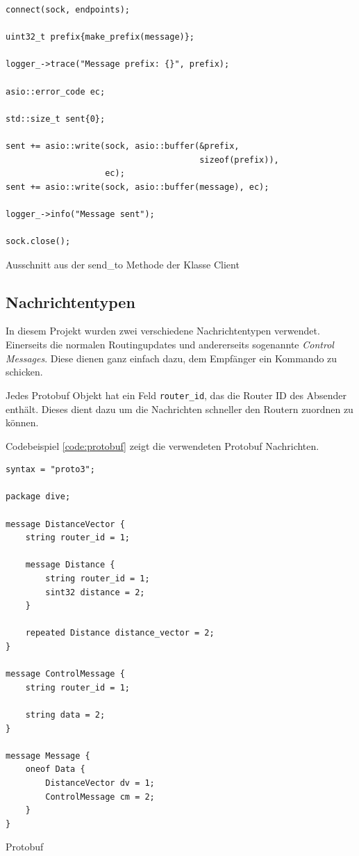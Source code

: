 \documentclass[a4paper,ngerman]{article}
\begin{document}
\begin{listing}
\begin{verbatim}
connect(sock, endpoints);

uint32_t prefix{make_prefix(message)};

logger_->trace("Message prefix: {}", prefix);

asio::error_code ec;

std::size_t sent{0};

sent += asio::write(sock, asio::buffer(&prefix,
                                       sizeof(prefix)),
                    ec);
sent += asio::write(sock, asio::buffer(message), ec);

logger_->info("Message sent");

sock.close();
\end{verbatim}

\caption{Ausschnitt aus der send\_to Methode der Klasse Client}
\label{code:client_send}
\end{listing}

\subsection{Nachrichtentypen}

In diesem Projekt wurden zwei verschiedene Nachrichtentypen verwendet. Einerseits die normalen Routingupdates und andererseits sogenannte \textit{Control Messages}. Diese dienen ganz einfach dazu, dem Empfänger ein Kommando zu schicken.

Jedes Protobuf Objekt hat ein Feld \lstinline{router_id}, das die Router ID des Absender enthält. Dieses dient dazu um die Nachrichten schneller den Routern zuordnen zu können.

Codebeispiel \vref{code:protobuf} zeigt die verwendeten Protobuf Nachrichten.

\begin{listing}
\begin{verbatim}
syntax = "proto3";

package dive;

message DistanceVector {
    string router_id = 1;

    message Distance {
        string router_id = 1;
        sint32 distance = 2;
    }

    repeated Distance distance_vector = 2;
}

message ControlMessage {
    string router_id = 1;

    string data = 2;
}

message Message {
    oneof Data {
        DistanceVector dv = 1;
        ControlMessage cm = 2;
    }
}
\end{verbatim}

\caption{Protobuf}
\label{code:protobuf}
\end{listing}
\end{document}

